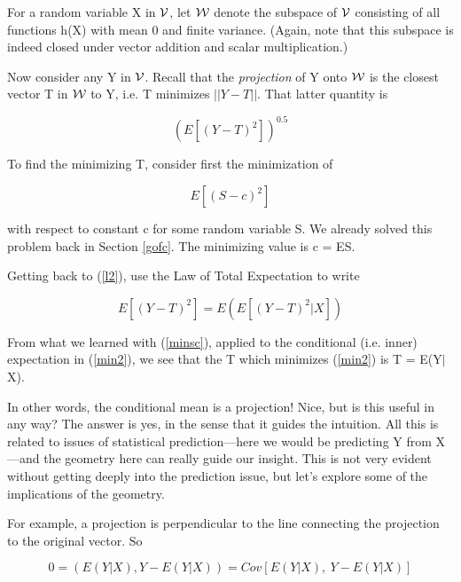 \documentclass[11pt]{article}
\begin{document}
For a random variable X in $\cal V$, let $\cal W$ denote the subspace of
$\cal V$ consisting of all functions h(X) with mean 0 and finite
variance.  (Again, note that this subspace is indeed closed under vector
addition and scalar multiplication.) 

Now consider any Y in $\cal V$.  Recall that the {\it projection} of Y
onto $\cal W$ is the closest vector T in $\cal W$ to Y, i.e. T minimizes
$||Y-T||$.  That latter quantity is 

\begin{equation}
\label{l2}
{\left ( E[{(Y-T)}^2] \right )}^{0.5}
\end{equation}

To find the minimizing T, consider first the minimization of

\begin{equation}
\label{minsc}
E[{(S-c)}^2]
\end{equation}

with respect to constant c for some random variable S.  We already
solved this problem back in Section \ref{gofc}.  The minimizing value 
is c = ES.

Getting back to (\ref{l2}), use the Law of Total Expectation to write

\begin{equation}
\label{min2}
E[{(Y-T)}^2] = E \left (  E[{(Y-T)}^2|X]\right )
\end{equation}

From what we learned with (\ref{minsc}), applied to the conditional
(i.e. inner) expectation in (\ref{min2}), we see that the T which
minimizes (\ref{min2}) is T = E(Y$|$X).  

In other words, the conditional mean is a projection!  Nice, but is this
useful in any way?  The answer is yes, in the sense that it guides the
intuition.  All this is related to issues of statistical
prediction---here we would be predicting Y from X---and the geometry
here can really guide our insight.  This is not very evident without
getting deeply into the prediction issue, but let's explore some of the
implications of the geometry.

For example, a projection is perpendicular to the line connecting the
projection to the original vector.  So

\begin{equation}
\label{err}
0 = (E(Y|X),Y-E(Y|X)) 
= Cov[E(Y|X), ~ Y-E(Y|X)]
\end{equation}
\end{document}
